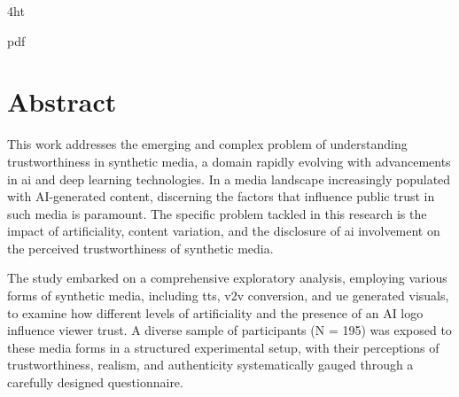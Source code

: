 \documentclass[
  a4paper,  %
  twoside,  %
  bibliography=totoc,
  headsepline,
  cleardoublepage=empty,
  parskip=half,
  draft=false
]{scrbook}
\begin{document}
\frontmatter
{} %
\setcounter{tocdepth}{2} %



\iftex4ht
  \Configure{$}{\PicMath}{\EndPicMath}{}

  {pdf}
  {%
  }
\fi



\Coverpage
\Copyright
\pagestyle{preamble}
\renewcommand*{\chapterpagestyle}{preamble}




\section*{Abstract}

This work addresses the emerging and complex problem of understanding trustworthiness in synthetic media, a domain rapidly evolving with advancements in \gls{ai} and deep learning technologies. In a media landscape increasingly populated with AI-generated content, discerning the factors that influence public trust in such media is paramount. The specific problem tackled in this research is the impact of artificiality, content variation, and the disclosure of \gls{ai} involvement on the perceived trustworthiness of synthetic media.

The study embarked on a comprehensive exploratory analysis, employing various forms of synthetic media, including \gls{tts}, \gls{v2v} conversion, and \gls{ue} generated visuals, to examine how different levels of artificiality and the presence of an AI logo influence viewer trust. A diverse sample of participants (N = 195) was exposed to these media forms in a structured experimental setup, with their perceptions of trustworthiness, realism, and authenticity systematically gauged through a carefully designed questionnaire.
\end{document}
